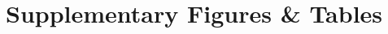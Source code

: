 \documentclass[onecolumn, compsoc,10pt]{IEEEtran}
\def\SUPPLEMENTARY{Supplementary\xspace}
\begin{document}








\clearpage                                                                      
\setcounter{figure}{0}
\renewcommand{\figurename}{Extended Data Figure}                               
\setcounter{table}{0}                                     
\renewcommand{\tablename}{Extended Data Table}                                 
%

\clearpage



\section*{Supplementary Figures \& Tables}

%
\end{document}
